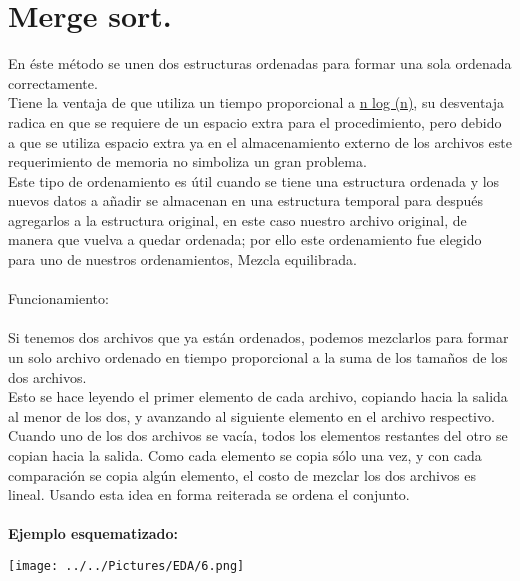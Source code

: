 \documentclass[12pt,letterpaper]{report}
\begin{document}
\section*{Merge sort.}
En éste método se unen dos estructuras ordenadas para formar una sola ordenada correctamente.\\
Tiene la ventaja de que utiliza un tiempo proporcional a \underline{n log (n)}, su desventaja radica en que se requiere de un espacio extra para el procedimiento, pero debido a que se utiliza espacio extra ya en el almacenamiento externo de los archivos este requerimiento de memoria no simboliza un gran problema.\\
Este tipo de ordenamiento es útil cuando se tiene una estructura ordenada y los nuevos datos a añadir se almacenan en una estructura temporal para después agregarlos a la estructura original, en este caso nuestro archivo original,  de manera que vuelva a quedar ordenada; por ello este ordenamiento fue elegido para uno de nuestros ordenamientos, Mezcla equilibrada.\\\\
Funcionamiento:\\\\
Si tenemos dos archivos que ya están ordenados, podemos mezclarlos para formar un solo archivo ordenado en tiempo proporcional a la suma de los tamaños de los dos archivos.\\
Esto se hace leyendo el primer elemento de cada archivo, copiando hacia la salida al menor de los dos, y avanzando al siguiente elemento en el archivo respectivo. Cuando uno de los dos archivos se vacía, todos los elementos restantes del otro se copian hacia la salida. Como cada elemento se copia sólo una vez, y con cada comparación se copia algún elemento, el costo de mezclar los dos archivos es lineal. Usando esta idea en forma reiterada se ordena el conjunto. \\\\
\textbf{Ejemplo esquematizado:}
\begin{center}
\texttt{[image: ../../Pictures/EDA/6.png]}  
\end{center}
\end{document}
